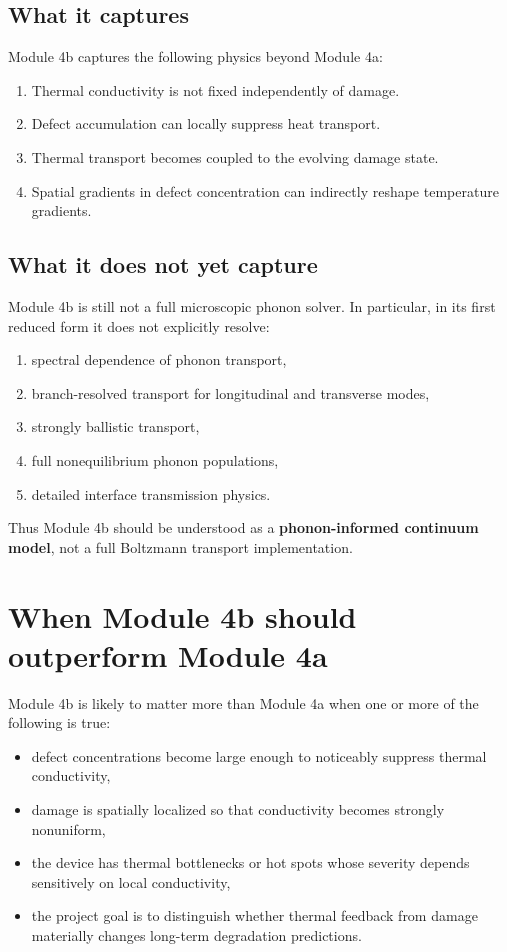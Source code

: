 \documentclass[11pt]{article}
\begin{document}
\subsection{What it captures}

Module 4b captures the following physics beyond Module 4a:
\begin{enumerate}[label=\arabic*.]
    \item Thermal conductivity is not fixed independently of damage.
    \item Defect accumulation can locally suppress heat transport.
    \item Thermal transport becomes coupled to the evolving damage state.
    \item Spatial gradients in defect concentration can indirectly reshape temperature gradients.
\end{enumerate}

\subsection{What it does not yet capture}

Module 4b is still not a full microscopic phonon solver. In particular, in its first reduced form it does not explicitly resolve:
\begin{enumerate}[label=\arabic*.]
    \item spectral dependence of phonon transport,
    \item branch-resolved transport for longitudinal and transverse modes,
    \item strongly ballistic transport,
    \item full nonequilibrium phonon populations,
    \item detailed interface transmission physics.
\end{enumerate}

Thus Module 4b should be understood as a \textbf{phonon-informed continuum model}, not a full Boltzmann transport implementation.

\section{When Module 4b should outperform Module 4a}

Module 4b is likely to matter more than Module 4a when one or more of the following is true:
\begin{itemize}
    \item defect concentrations become large enough to noticeably suppress thermal conductivity,
    \item damage is spatially localized so that conductivity becomes strongly nonuniform,
    \item the device has thermal bottlenecks or hot spots whose severity depends sensitively on local conductivity,
    \item the project goal is to distinguish whether thermal feedback from damage materially changes long-term degradation predictions.
\end{itemize}
\end{document}
